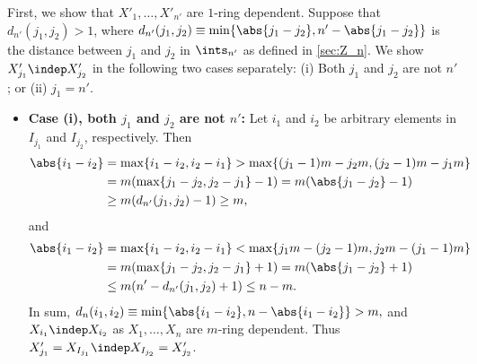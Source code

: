 \documentclass[aos]{imsart}
\begin{document}
\begin{appendix}
First, we show that $X'_1, \dots, X'_{n'}$ are $1$-ring dependent. Suppose that $d_{n'}(j_1,j_2) > 1$, where $d_{n'}(j_1,j_2) \equiv \min\{\abs{j_1-j_2}, n'-\abs{j_1-j_2}\}$ is the distance between $j_1$ and $j_2$ in $\ints_{n'}$ as defined in \cref{sec:Z_n}. We show $X'_{j_1} \indep X'_{j_2}$ in the following two cases separately: (i) Both $j_1$ and $j_2$ are not $n'$; or (ii) $j_1 = n'$.
%
\begin{itemize}
    \item {\bf Case (i), both $j_1$ and $j_2$ are not $n'$:} Let $i_1$ and $i_2$ be arbitrary elements in $I_{j_1}$ and $I_{j_2}$, respectively. Then
    \begin{equation*}
    \begin{aligned}
        \abs{i_1 - i_2} 
        & = \max\{i_1 - i_2, i_2 - i_1\}
        > \max\{ (j_1-1)m - j_2m, (j_2-1)m - j_1m \} \\
        & = m (\max\{j_1 - j_2, j_2 - j_1\} - 1)
        = m (\abs{j_1 - j_2} - 1) \\
        & \geq m (d_{n'}(j_1, j_2) - 1) \geq m,
    \end{aligned}
    \end{equation*}
    and
    \begin{equation*}
    \begin{aligned}
        \abs{i_1 - i_2} 
        & = \max\{i_1 - i_2, i_2 - i_1\}
        < \max\{ j_1m - (j_2-1)m, j_2m - (j_1-1)m \} \\
        & = m (\max\{j_1 - j_2, j_2 - j_1\} + 1)
        = m (\abs{j_1 - j_2} + 1) \\
        & \leq m (n' - d_{n'}(j_1, j_2) + 1) \leq n - m.
    \end{aligned}
    \end{equation*}
    In sum,
    \(
        d_n(i_1, i_2) \equiv \min\{\abs{i_1-i_2}, n-\abs{i_1-i_2}\}
        > m,
    \)
    and $X_{i_1} \indep X_{i_2}$ as $X_1, \dots, X_n$ are $m$-ring dependent. Thus $X'_{j_1} = X_{I_{j_1}} \indep X_{I_{j_2}} = X'_{j_2}$.
    

\end{itemize}
\end{appendix}
\end{document}
